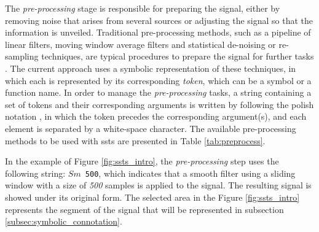 The \textit{pre-processing} stage is responsible for preparing the signal, either by removing noise that arises from several sources or adjusting the signal so that the information is unveiled. Traditional pre-processing methods, such as a pipeline of linear filters, moving window average filters and statistical de-noising or re-sampling techniques, are typical procedures to prepare the signal for further tasks \cite{preProcessing}. The current approach uses a symbolic representation of these techniques, in which each is represented by its corresponding \textit{token}, which can be a symbol or a function name. In order to manage the \textit{pre-processing} tasks, a string containing a set of tokens and their corresponding arguments is written by following the polish notation \cite{polishNotation}, in which the token precedes the corresponding argument(s), and each element is separated by a white-space character. The available pre-processing methods to be used with \gls{ssts} are presented in Table \ref{tab:preprocess}.
\par
In the example of Figure \ref{fig:ssts_intro}, the \textit{pre-processing} step uses the following string: \texttt{$Sm$ 500}, which indicates that a smooth filter using a sliding window with a size of \textit{500} samples is applied to the signal. The resulting signal is showed under its original form. The selected area in the Figure \ref{fig:ssts_intro} represents the segment of the signal that will be represented in subsection \ref{subsec:symbolic_connotation}.

